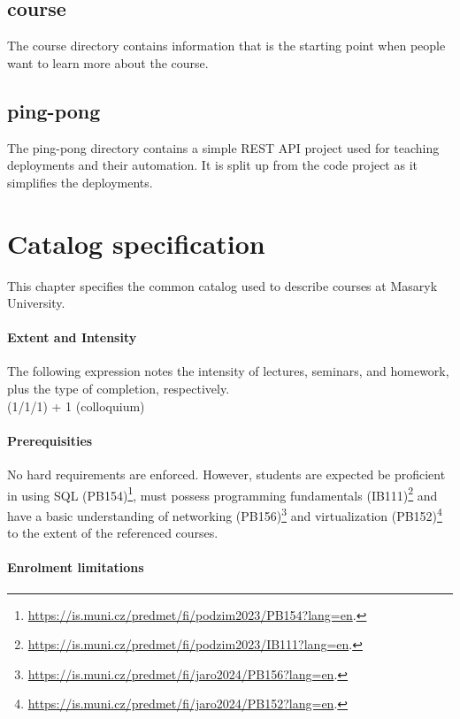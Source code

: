 \documentclass[
  digital,
  color,
  oneside,
  nosansbold,
  nocolorbold,
  lof,
  nolot,
]{fithesis4}
\begin{document}
\section{course}

The course directory contains information that is the starting point when people want to learn more about the course.
\section{ping-pong}

The ping-pong directory contains a simple REST API project used for teaching deployments and their automation. It is split up from the code project as it simplifies the deployments.

\chapter{Catalog specification}

This chapter specifies the common catalog used to describe courses at Masaryk University.

\subsubsection{Extent and Intensity}

The following expression notes the intensity of lectures, seminars, and homework, plus the type of completion, respectively. \\

\noindent
(1/1/1) + 1 (colloquium)

\subsubsection{Prerequisities}

No hard requirements are enforced. However, students are expected be proficient in using SQL (PB154)\footnote{ \url{https://is.muni.cz/predmet/fi/podzim2023/PB154?lang=en}.}, must possess programming fundamentals (IB111)\footnote{ \url{https://is.muni.cz/predmet/fi/podzim2023/IB111?lang=en}.} and have a basic understanding of networking (PB156)\footnote{\url{https://is.muni.cz/predmet/fi/jaro2024/PB156?lang=en}.} and virtualization (PB152)\footnote{\url{https://is.muni.cz/predmet/fi/jaro2024/PB152?lang=en}.} to the extent of the referenced courses.

\subsubsection{Enrolment limitations}
\end{document}
